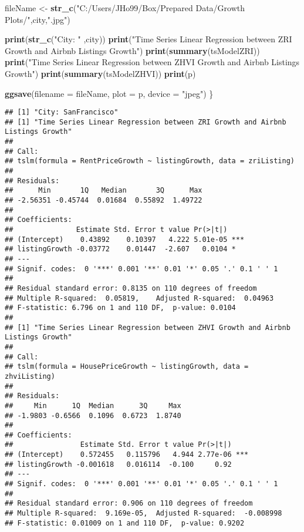 \documentclass[
]{article}
\newenvironment{Shaded}{\begin{snugshade}}{\end{snugshade}}
\newcommand{\DataTypeTok}[1]{\textcolor[rgb]{0.13,0.29,0.53}{#1}}
\newcommand{\KeywordTok}[1]{\textcolor[rgb]{0.13,0.29,0.53}{\textbf{#1}}}
\newcommand{\NormalTok}[1]{#1}
\newcommand{\StringTok}[1]{\textcolor[rgb]{0.31,0.60,0.02}{#1}}
\begin{document}
\begin{Shaded}
\begin{Highlighting}[]
\NormalTok{  fileName <-}\StringTok{ }\KeywordTok{str_c}\NormalTok{(}\StringTok{"C:/Users/JHo99/Box/Prepared Data/Growth Plots/"}\NormalTok{,city,}\StringTok{".jpg"}\NormalTok{)}
  
  \KeywordTok{print}\NormalTok{(}\KeywordTok{str_c}\NormalTok{(}\StringTok{"City: "}\NormalTok{ ,city))}
  \KeywordTok{print}\NormalTok{(}\StringTok{"Time Series Linear Regression between ZRI Growth and Airbnb Listings Growth"}\NormalTok{)}
  \KeywordTok{print}\NormalTok{(}\KeywordTok{summary}\NormalTok{(tsModelZRI))}
  \KeywordTok{print}\NormalTok{(}\StringTok{"Time Series Linear Regression between ZHVI Growth and Airbnb Listings Growth"}\NormalTok{)}
  \KeywordTok{print}\NormalTok{(}\KeywordTok{summary}\NormalTok{(tsModelZHVI))}
  \KeywordTok{print}\NormalTok{(p)}
  
  \KeywordTok{ggsave}\NormalTok{(}\DataTypeTok{filename =}\NormalTok{ fileName, }\DataTypeTok{plot =}\NormalTok{ p, }\DataTypeTok{device =} \StringTok{"jpeg"}\NormalTok{)}
\NormalTok{\}}
\end{Highlighting}
\end{Shaded}

\begin{verbatim}
## [1] "City: SanFrancisco"
## [1] "Time Series Linear Regression between ZRI Growth and Airbnb Listings Growth"
## 
## Call:
## tslm(formula = RentPriceGrowth ~ listingGrowth, data = zriListing)
## 
## Residuals:
##      Min       1Q   Median       3Q      Max 
## -2.56351 -0.45744  0.01684  0.55892  1.49722 
## 
## Coefficients:
##               Estimate Std. Error t value Pr(>|t|)    
## (Intercept)    0.43892    0.10397   4.222 5.01e-05 ***
## listingGrowth -0.03772    0.01447  -2.607   0.0104 *  
## ---
## Signif. codes:  0 '***' 0.001 '**' 0.01 '*' 0.05 '.' 0.1 ' ' 1
## 
## Residual standard error: 0.8135 on 110 degrees of freedom
## Multiple R-squared:  0.05819,    Adjusted R-squared:  0.04963 
## F-statistic: 6.796 on 1 and 110 DF,  p-value: 0.0104
## 
## [1] "Time Series Linear Regression between ZHVI Growth and Airbnb Listings Growth"
## 
## Call:
## tslm(formula = HousePriceGrowth ~ listingGrowth, data = zhviListing)
## 
## Residuals:
##     Min      1Q  Median      3Q     Max 
## -1.9803 -0.6566  0.1096  0.6723  1.8740 
## 
## Coefficients:
##                Estimate Std. Error t value Pr(>|t|)    
## (Intercept)    0.572455   0.115796   4.944 2.77e-06 ***
## listingGrowth -0.001618   0.016114  -0.100     0.92    
## ---
## Signif. codes:  0 '***' 0.001 '**' 0.01 '*' 0.05 '.' 0.1 ' ' 1
## 
## Residual standard error: 0.906 on 110 degrees of freedom
## Multiple R-squared:  9.169e-05,  Adjusted R-squared:  -0.008998 
## F-statistic: 0.01009 on 1 and 110 DF,  p-value: 0.9202
\end{verbatim}
\end{document}
